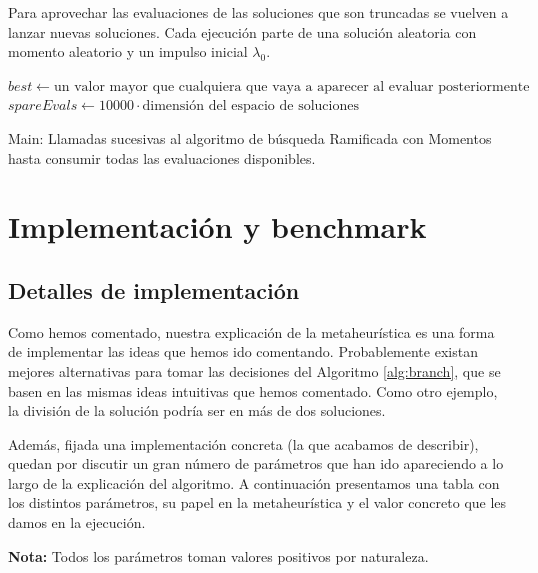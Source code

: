 \documentclass{article}
\begin{document}
Para aprovechar las evaluaciones de las soluciones que son truncadas se vuelven a lanzar nuevas soluciones.
Cada ejecución parte de una solución aleatoria con momento aleatorio y un impulso inicial $\lambda_0$.

\begin{algorithm}[H]
	\DontPrintSemicolon %
	$best\gets\text{un valor mayor que cualquiera que vaya a aparecer al evaluar posteriormente}$\;
	$spareEvals\gets 10000\cdot\text{dimensión del espacio de soluciones}$\;
	\caption{{\sc Main:} Llamadas sucesivas al algoritmo de búsqueda Ramificada con Momentos hasta consumir todas las evaluaciones
		disponibles.}
	\label{alg:main}
\end{algorithm}

\newpage

\section{Implementación y benchmark}

\subsection{Detalles de implementación}

Como hemos comentado, nuestra explicación de la metaheurística es una forma de implementar las ideas que hemos ido comentando.
Probablemente existan mejores alternativas para tomar las decisiones del Algoritmo \ref{alg:branch}, que se basen en las mismas
ideas intuitivas que hemos comentado. Como otro ejemplo, la división de la solución podría ser en más de dos soluciones.

Además, fijada una implementación concreta (la que acabamos de describir), quedan por discutir un gran número de parámetros
que han ido apareciendo a lo largo de la explicación del algoritmo. A continuación presentamos una tabla con los distintos
parámetros, su papel en la metaheurística y el valor concreto que les damos en la ejecución.

\textbf{Nota:} Todos los parámetros toman valores positivos por naturaleza.
\end{document}
